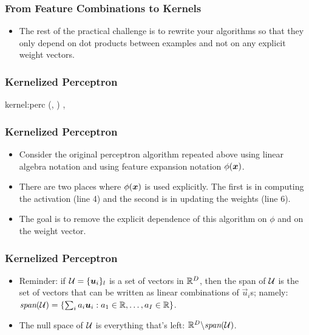 \documentclass[trans]{beamer}
\begin{document}
\begin{frame}
  \frametitle{From Feature Combinations to Kernels}
\begin{itemize}
\item 
The rest of the practical challenge is to rewrite your algorithms so
that they only depend on dot products between examples and not on any
explicit weight vectors.
\end{itemize}
\end{frame}
\begin{frame}
  \frametitle{Kernelized Perceptron}
\newalgorithm%
  {kernel:perc}%
  {(, )}
  {
\ENDIF
\ENDFOR
\ENDFOR
\RETURN \VAR{$\vw$}, 
}
\end{frame}
\begin{frame}
  \frametitle{Kernelized Perceptron}
\begin{itemize}
\item 
Consider the original perceptron algorithm 
 repeated above
using linear algebra notation and using feature expansion notation
$\phi({\boldsymbol{x}})$. 
\item There are two places where
$\phi({\boldsymbol{x}})$ is used explicitly.  The first is in computing the
activation (line 4) and the second is in updating the weights (line
6).  
\item The goal is to remove the explicit dependence of this algorithm
on $\phi$ and on the weight vector.
\end{itemize}
\end{frame}
\begin{frame}
  \frametitle{Kernelized Perceptron}
\begin{itemize}
\item 
  Reminder: if $\mathcal{U} = \{ \boldsymbol{u}_i \}_l$ is a set of vectors in $\mathbb{R}^D$, then
  the span of $\mathcal{U}$ is the set of vectors that can be written as
  linear combinations of $\vec u_i$s; namely: $\textit{span}(\mathcal{U}) = \{
  \sum_i a_i \boldsymbol{u}_i : a_1 \in \mathbb{R}, \dots, a_I \in \mathbb{R} \}$.
\item 
  The null space of $\mathcal{U}$ is everything that's left: $\mathbb{R}^D \backslash
  \textit{span}(\mathcal{U})$.
\end{itemize}
\end{frame}
\end{document}
